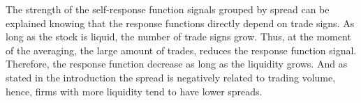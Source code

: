 The strength of the self-response function signals grouped by spread can be
explained knowing that the response functions directly depend on trade signs.
As long as the stock is liquid, the number of trade signs grow. Thus, at the
moment of the averaging, the large amount of trades, reduces the response
function signal. Therefore, the response function decrease as long as the
liquidity grows. And as stated in the introduction the spread is negatively
related to trading volume, hence, firms with more liquidity tend to have lower
spreads.
